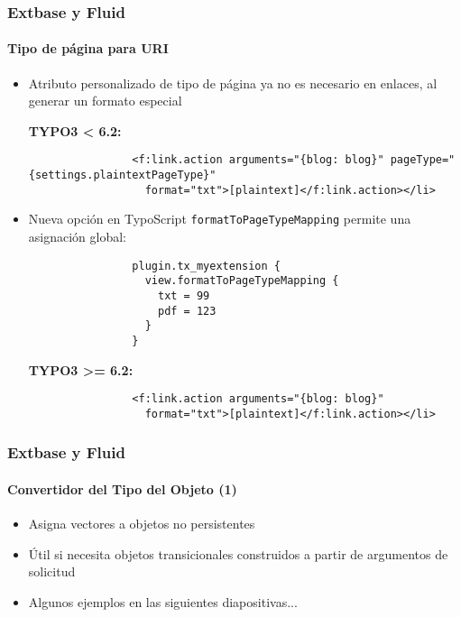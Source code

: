 
\begin{frame}[fragile]
	\frametitle{Extbase y Fluid}
	\framesubtitle{Tipo de página para URI}

	\lstset{
		basicstyle=\tiny\ttfamily
	}

	\begin{itemize}
		\item Atributo personalizado de tipo de página ya no es necesario en enlaces, al generar un formato especial

			\smaller\textbf{TYPO3 < 6.2:}\normalsize
			\begin{lstlisting}
				<f:link.action arguments="{blog: blog}" pageType="{settings.plaintextPageType}"
				  format="txt">[plaintext]</f:link.action></li>
			\end{lstlisting}

		\item Nueva opción en TypoScript \texttt{formatToPageTypeMapping} permite una asignación global:

			\begin{lstlisting}
				plugin.tx_myextension {
				  view.formatToPageTypeMapping {
				    txt = 99
				    pdf = 123
				  }
				}
			\end{lstlisting}

			\smaller\textbf{TYPO3 >= 6.2:}\normalsize
			\begin{lstlisting}
				<f:link.action arguments="{blog: blog}"
				  format="txt">[plaintext]</f:link.action></li>
			\end{lstlisting}

	\end{itemize}

\end{frame}


\begin{frame}[fragile]
	\frametitle{Extbase y Fluid}
	\framesubtitle{Convertidor del Tipo del Objeto (1)}

	\lstset{
		basicstyle=\tiny\ttfamily
	}

	\begin{itemize}
		\item Asigna vectores a objetos no persistentes
		\item Útil si necesita objetos transicionales construidos a partir de argumentos de solicitud
		\item Algunos ejemplos en las siguientes diapositivas...

	\end{itemize}

\end{frame}

